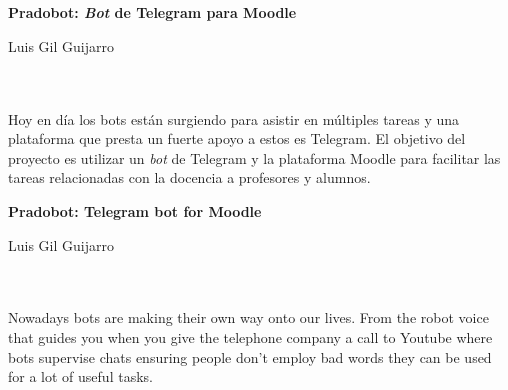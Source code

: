 \chapter*{}


%



\cleardoublepage
\thispagestyle{empty}

\begin{center}
{\large\bfseries Pradobot: \textit{Bot} de Telegram para Moodle}\\
\end{center}
\begin{center}
Luis Gil Guijarro\\
\end{center}

\\

\vspace{0.7cm}
\\

Hoy en día los bots están surgiendo para asistir en múltiples tareas y una plataforma que presta un fuerte apoyo a estos es Telegram. El objetivo del proyecto es utilizar un \textit{bot} de Telegram y la plataforma Moodle para  facilitar las tareas relacionadas con la docencia a  profesores y alumnos.

\cleardoublepage


\thispagestyle{empty}


\begin{center}
{\large\bfseries Pradobot: Telegram bot for Moodle}\\
\end{center}
\begin{center}
Luis Gil Guijarro\\
\end{center}

\\

\vspace{0.7cm}
\\


Nowadays bots are making their own way onto our lives. From the robot voice that guides you when you give the telephone company a call  to Youtube where bots supervise chats ensuring people don't employ bad words they can be used for a lot of useful tasks.

